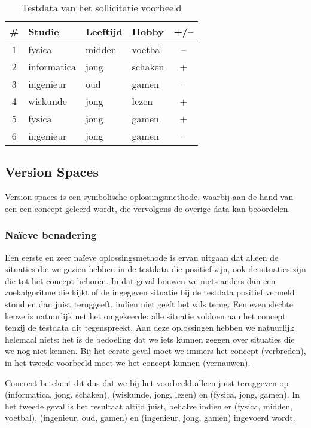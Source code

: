 \begin{table}[htb]
\centering
\begin{tabular}{c|l|l|l|c}
\#&Studie&Leeftijd&Hobby&+/--\\\hline
1&fysica&midden&voetbal&--\\
2&informatica&jong&schaken&+\\
3&ingenieur&oud&gamen&--\\
4&wiskunde&jong&lezen&+\\
5&fysica&jong&gamen&+\\
6&ingenieur&jong&gamen&--
\end{tabular}
\caption{Testdata van het sollicitatie voorbeeld}
\label{tbl:sollicitatieTestData}
\end{table}
\subsection{Version Spaces}
Version spaces is een symbolische oplossingsmethode, waarbij aan de hand van een  een concept geleerd wordt, die vervolgens de overige data kan beoordelen.
\subsubsection{Na\"ieve benadering}
\label{sss:versionSpacesNaif}
Een eerste en zeer na\"ieve oplossingsmethode is ervan uitgaan dat alleen de situaties die we gezien hebben in de testdata die positief zijn, ook de situaties zijn die tot het concept behoren. In dat geval bouwen we niets anders dan een zoekalgoritme die kijkt of de ingegeven situatie bij de testdata positief vermeld stond en dan juist teruggeeft, indien niet geeft het vals terug. Een even slechte keuze is natuurlijk net het omgekeerde: alle situatie voldoen aan het concept tenzij de testdata dit tegenspreekt. Aan deze oplossingen hebben we natuurlijk helemaal niets: het is de bedoeling dat we iets kunnen zeggen over situaties die we nog niet kennen. Bij het eerste geval moet we immers het concept  (verbreden), in het tweede voorbeeld moet we het concept kunnen  (vernauwen).
\begin{leftbar}
Concreet betekent dit dus dat we bij het voorbeeld alleen juist teruggeven op (informatica, jong, schaken), (wiskunde, jong, lezen) en (fysica, jong, gamen). In het tweede geval is het resultaat altijd juist, behalve indien er (fysica, midden, voetbal), (ingenieur, oud, gamen) en (ingenieur, jong, gamen) ingevoerd wordt. 
\end{leftbar}
